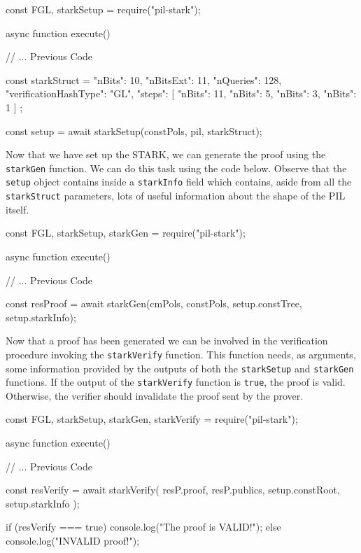 \begin{js}
    const { FGL, starkSetup } = require("pil-stark");
    
    async function execute() {
        
        // ... Previous Code	
        
        const starkStruct = {
            "nBits": 10,
            "nBitsExt": 11,
            "nQueries": 128,
            "verificationHashType": "GL",
            "steps": [
            {"nBits": 11},
            {"nBits": 5},
            {"nBits": 3},
            {"nBits": 1}
            ]
        };
        
        const setup = await starkSetup(constPols, pil, starkStruct);
    }
\end{js}

Now that we have set up the STARK, we can generate the proof using the \texttt{starkGen} function. We can do this task using the code below. Observe that the \texttt{setup} object contains inside a \texttt{starkInfo} field which contains, aside from all the \texttt{starkStruct} parameters, lots of useful information about the shape of the PIL itself. 

\begin{js}
    const { FGL, starkSetup, starkGen } = require("pil-stark");
    
    async function execute() {
        
        // ... Previous Code	
        
        const resProof = await starkGen(cmPols, constPols, setup.constTree, setup.starkInfo);
    }
\end{js}

Now that a proof has been generated we can be involved in the verification procedure invoking the \texttt{starkVerify} function. This function needs, as arguments, some information provided by the outputs of both the \texttt{starkSetup} and \texttt{starkGen} functions. If the output of the \texttt{starkVerify} function is \texttt{true}, the proof is valid. Otherwise, the verifier should invalidate the proof sent by the prover. 

\begin{js}
    const { FGL, starkSetup, starkGen, starkVerify } = require("pil-stark");
    
    async function execute() {
        
        // ... Previous Code
        
        const resVerify = await starkVerify(
        resP.proof, resP.publics, setup.constRoot, setup.starkInfo
        );
        
        if (resVerify === true) {
            console.log("The proof is VALID!");
        } else {
            console.log("INVALID proof!");
        }
    }
\end{js}
